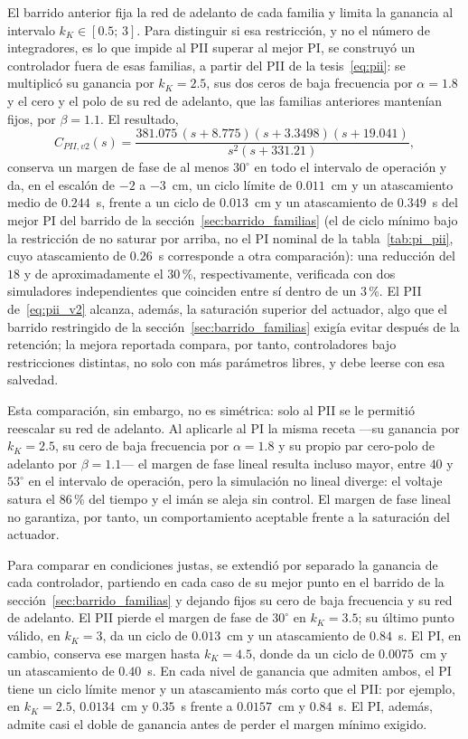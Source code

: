 El barrido anterior fija la red de adelanto de cada familia y limita la ganancia al intervalo $k_K\in[0.5;\,3]$. Para distinguir si esa restricción, y no el número de integradores, es lo que impide al PII superar al mejor PI, se construyó un controlador fuera de esas familias, a partir del PII de la tesis~\eqref{eq:pii}: se multiplicó su ganancia por $k_K=2.5$, sus dos ceros de baja frecuencia por $\alpha=1.8$ y el cero y el polo de su red de adelanto, que las familias anteriores mantenían fijos, por $\beta=1.1$. El resultado,
\begin{equation}
C_{PII,v2}(s) = \frac{381.075\,(s+8.775)(s+3.3498)(s+19.041)}{s^{2}(s+331.21)} ,
\label{eq:pii_v2}
\end{equation}
conserva un margen de fase de al menos $30^\circ$ en todo el intervalo de operación y da, en el escalón de $-2$ a $-3$~cm, un ciclo límite de $0.011$~cm y un atascamiento medio de $0.244$~s, frente a un ciclo de $0.013$~cm y un atascamiento de $0.349$~s del mejor PI del barrido de la sección~\ref{sec:barrido_familias} (el de ciclo mínimo bajo la restricción de no saturar por arriba, no el PI nominal de la tabla~\ref{tab:pi_pii}, cuyo atascamiento de $0.26$~s corresponde a otra comparación): una reducción del $18$ y de aproximadamente el $30$\,\%, respectivamente, verificada con dos simuladores independientes que coinciden entre sí dentro de un $3$\,\%. El PII de~\eqref{eq:pii_v2} alcanza, además, la saturación superior del actuador, algo que el barrido restringido de la sección~\ref{sec:barrido_familias} exigía evitar después de la retención; la mejora reportada compara, por tanto, controladores bajo restricciones distintas, no solo con más parámetros libres, y debe leerse con esa salvedad.

Esta comparación, sin embargo, no es simétrica: solo al PII se le permitió reescalar su red de adelanto. Al aplicarle al PI la misma receta ---su ganancia por $k_K=2.5$, su cero de baja frecuencia por $\alpha=1.8$ y su propio par cero-polo de adelanto por $\beta=1.1$--- el margen de fase lineal resulta incluso mayor, entre $40$ y $53^\circ$ en el intervalo de operación, pero la simulación no lineal diverge: el voltaje satura el $86$\,\% del tiempo y el imán se aleja sin control. El margen de fase lineal no garantiza, por tanto, un comportamiento aceptable frente a la saturación del actuador.

Para comparar en condiciones justas, se extendió por separado la ganancia de cada controlador, partiendo en cada caso de su mejor punto en el barrido de la sección~\ref{sec:barrido_familias} y dejando fijos su cero de baja frecuencia y su red de adelanto. El PII pierde el margen de fase de $30^\circ$ en $k_K=3.5$; su último punto válido, en $k_K=3$, da un ciclo de $0.013$~cm y un atascamiento de $0.84$~s. El PI, en cambio, conserva ese margen hasta $k_K=4.5$, donde da un ciclo de $0.0075$~cm y un atascamiento de $0.40$~s. En cada nivel de ganancia que admiten ambos, el PI tiene un ciclo límite menor y un atascamiento más corto que el PII: por ejemplo, en $k_K=2.5$, $0.0134$~cm y $0.35$~s frente a $0.0157$~cm y $0.84$~s. El PI, además, admite casi el doble de ganancia antes de perder el margen mínimo exigido.

